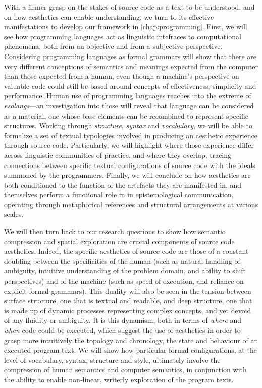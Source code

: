 With a firmer grasp on the stakes of source code as a text to be understood, and on how aesthetics can enable understanding, we turn to its effective manifestations to develop our framework in \ref{chap:programming}. First, we will see how programming languages act as linguistic intefraces to computational phenomena, both from an objective and from a subjective perspective. Considering programming languages as formal grammars will show that there are very different conceptions of semantics and meanings expected from the computer than those expected from a human, even though a machine's perspective on valuable code could still be based around concepts of effectiveness, simplicity and performance. Human use of programming languages reaches into the extreme of \emph{esolangs}—an investigation into those will reveal that language can be considered as a material, one whose base elements can be recombined to represent specific structures. Working through \emph{structure}, \emph{syntax} and \emph{vocabulary}, we will be able to formalize a set of textual typologies involved in producing an aesthetic experience through source code. Particularly, we will highlight where those experience differ across linguistic communities of practice, and where they overlap, tracing connections between specific textual configurations of source code with the ideals summoned by the programmers. Finally, we will conclude on how aesthetics are both conditioned to the function of the artefacts they are manifested in, and themselves perform a functional role in in epistemological communication, operating through metaphorical references and structural arrangements at various scales.

We will then turn back to our research questions to show how semantic compression and spatial exploration are crucial components of source code aesthetics. Indeed, the specific aesthetics of source code are those of a constant doubling between the specificities of the human (such as natural handling of ambiguity, intuitive understanding of the problem domain, and ability to shift perspectives) and of the machine (such as speed of execution, and reliance on explicit formal grammars). This duality will also be seen in the tension between surface structure, one that is textual and readable, and deep structure, one that is made up of dynamic processes representing complex concepts, and yet devoid of any fluidity or ambiguity. It is this dynamism, both in terms of \emph{where} and \emph{when} code could be executed, which suggest the use of aesthetics in order to grasp more intuitively the topology and chronology, the state and behaviour of an executed program text. We will show how particular formal configurations, at the level of vocabulary, syntax, structure and style, ultimately involve the compression of human semantics and computer semantics, in conjunction with the ability to enable non-linear, writerly exploration of the program texts.

